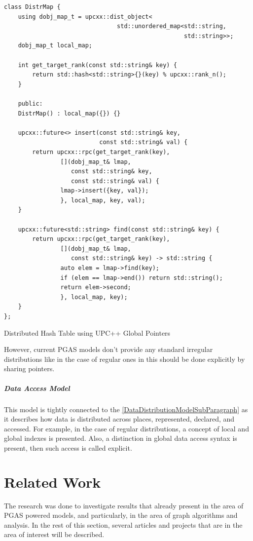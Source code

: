 \documentclass[14pt]{extreport}
\newcommand\blankpage{
    \null
    \thispagestyle{empty}
    \newpage
    }
\begin{document}
\begin{listing}[H]
\begin{verbatim}
class DistrMap {
	using dobj_map_t = upcxx::dist_object<
								std::unordered_map<std::string,	
												   std::string>>;
	dobj_map_t local_map;

	int get_target_rank(const std::string& key) {
		return std::hash<std::string>{}(key) % upcxx::rank_n();
	}

	public:
	DistrMap() : local_map({}) {}

	upcxx::future<> insert(const std::string& key, 
						   const std::string& val) {
		return upcxx::rpc(get_target_rank(key),
				[](dobj_map_t& lmap, 
				   const std::string& key, 
				   const std::string& val) {
				lmap->insert({key, val});
				}, local_map, key, val);
	}

	upcxx::future<std::string> find(const std::string& key) {
		return upcxx::rpc(get_target_rank(key),
				[](dobj_map_t& lmap, 
				   const std::string& key) -> std::string {
				auto elem = lmap->find(key);
				if (elem == lmap->end()) return std::string();
				return elem->second;
				}, local_map, key);
	}
};
\end{verbatim}
\caption{Distributed Hash Table using UPC++ Global Pointers}
\end{listing}

However, current PGAS models don't provide any standard irregular distributions like in the case of regular ones in this should be done explicitly by sharing pointers.

\subparagraph{Data Access Model}
This model is tightly connected to the \ref{DataDistributionModelSubParagraph} as it describes how data is distributed across places, represented, declared, and accessed. For example, in the case of regular distributions, a concept of local and global indexes is presented. Also, a distinction in global data access syntax is present, then such access is called explicit.

\blankpage
\section{Related Work}
The research was done to investigate results that already present in the area of PGAS powered models, and particularly, in the area of graph algorithms and analysis. In the rest of this section, several articles and projects that are in the area of interest will be described.
\end{document}
